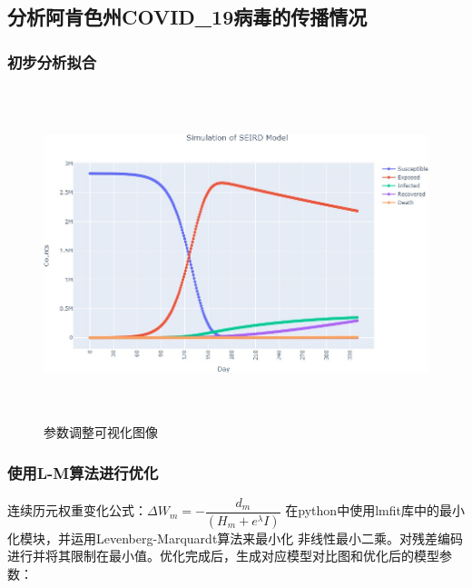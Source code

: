 \documentclass[withoutpreface,bwprint]{cumcmthesis} %
\begin{document}
\subsection{分析阿肯色州COVID\_19病毒的传播情况}
\subsubsection{初步分析拟合}

\clearpage
\begin{figure}[!htp]
    \centerline{\includegraphics[width=15.65cm,height=9.67cm]{figures/参数拟合.png}}
    \caption{参数调整可视化图像}
\end{figure}

\vspace*{-1.2cm}
\subsubsection{使用L-M算法进行优化}
连续历元权重变化公式：$\Delta W_{m}=-\dfrac{d_{m}}{(H_{m}+e^{\lambda}I)}$
在python中使用lmﬁt库中的最小化模块，并运用Levenberg-Marquardt算法来最小化
非线性最小二乘。对残差编码进行并将其限制在最小值。优化完成后，生成对应模型对比图和优化后的模型参数：

\vspace*{-0.25cm}
\end{document}
